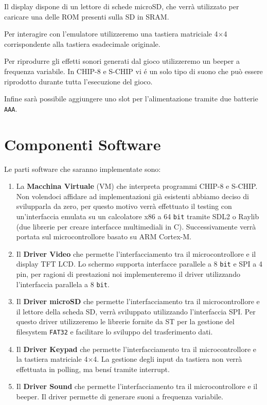 \documentclass[a4paper]{article}
\begin{document}
Il display dispone di un lettore di schede microSD, che verrà utilizzato per caricare una delle ROM presenti sulla SD in SRAM.

Per interagire con l'emulatore utilizzeremo una tastiera matriciale 4$\times$4 corrispondente alla tastiera esadecimale originale.

Per riprodurre gli effetti sonori generati dal gioco utilizzeremo un beeper a frequenza variabile. In CHIP-8 e S-CHIP vi é un solo tipo di suono che può essere riprodotto durante tutta l'esecuzione del gioco.

Infine sarà possibile aggiungere uno slot per l'alimentazione tramite due batterie \texttt{AAA}.

\section{Componenti Software}

Le parti software che saranno implementate sono:

\begin{enumerate}
	\item La \textbf{Macchina Virtuale} (VM) che interpreta programmi CHIP-8 e S-CHIP. Non volendoci affidare ad implementazioni già esistenti abbiamo deciso di svilupparla da zero, per questo motivo verrà effettuato il testing con un'interfaccia emulata su un calcolatore \textrm{x}86 a 64 \texttt{bit} tramite SDL2 o Raylib (due librerie per creare interfacce multimediali in C). Successivamente verrà portata sul microcontrollore basato su ARM Cortex-M.
	\item Il \textbf{Driver Video} che permette l'interfacciamento tra il microcontrollore e il display TFT LCD. Lo schermo supporta interfacce parallele a 8 \texttt{bit} e SPI a 4 pin, per ragioni di prestazioni noi implementeremo il driver utilizzando l'interfaccia parallela a 8 \texttt{bit}.
	\item Il \textbf{Driver microSD} che permette l'interfacciamento tra il microcontrollore e il lettore della scheda SD, verrà sviluppato utilizzando l'interfaccia SPI. Per questo driver utilizzeremo le librerie fornite da ST per la gestione del filesystem \texttt{FAT32} e facilitare lo sviluppo del trasferimento dati.
	\item Il \textbf{Driver Keypad} che permette l'interfacciamento tra il microcontrollore e la tastiera matriciale 4$\times$4. La gestione degli input da tastiera non verrà effettuata in polling, ma bens\'{i} tramite interrupt.
	\item Il \textbf{Driver Sound} che permette l'interfacciamento tra il microcontrollore e il beeper. Il driver permette di generare suoni a frequenza variabile.
\end{enumerate}
\end{document}
